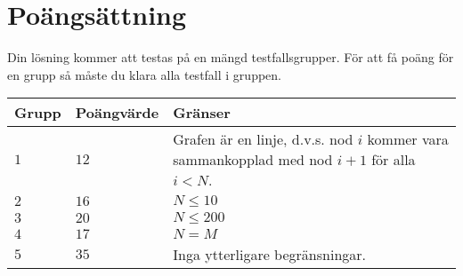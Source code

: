 \section*{Poängsättning}
Din lösning kommer att testas på en mängd testfallsgrupper.
För att få poäng för en grupp så måste du klara alla testfall i gruppen.

\noindent
\begin{tabular}{| l | l | l |}
\hline
Grupp & Poängvärde & Gränser \\ \hline
$1$   & $12$       & Grafen är en linje, d.v.s. nod $i$ kommer vara sammankopplad med nod $i+1$ för alla $i < N$.  \\ \hline
$2$   & $16$       & $N \leq 10$ \\ \hline
$3$   & $20$       & $N \leq 200$ \\ \hline
$4$   & $17$       & $N = M$ \\ \hline
$5$   & $35$       & Inga ytterligare begränsningar. \\ \hline
\end{tabular}
